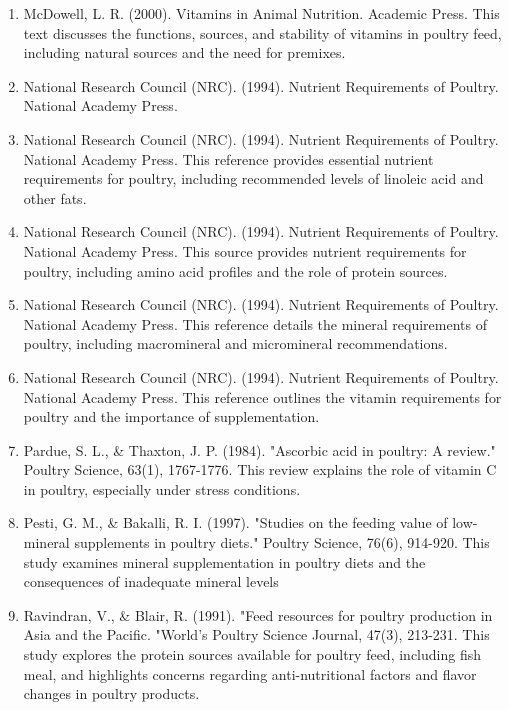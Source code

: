 \documentclass[a4paper,12pt]{article}
\begin{document}
\begin{enumerate}
	\item McDowell, L. R. (2000). Vitamins in Animal Nutrition. Academic Press. This text
discusses the functions, sources, and stability of vitamins in poultry feed, including
natural sources and the need for premixes.

	\item National Research Council (NRC). (1994). Nutrient Requirements of Poultry. National
Academy Press.

	\item National Research Council (NRC). (1994). Nutrient Requirements of Poultry. National
Academy Press. This reference provides essential nutrient requirements for poultry,
including recommended levels of linoleic acid and other fats.

	\item National Research Council (NRC). (1994). Nutrient Requirements of Poultry. National
Academy Press. This source provides nutrient requirements for poultry, including amino
acid profiles and the role of protein sources.

	\item National Research Council (NRC). (1994). Nutrient Requirements of Poultry. National
Academy Press. This reference details the mineral requirements of poultry, including
macromineral and micromineral recommendations.

	\item National Research Council (NRC). (1994). Nutrient Requirements of Poultry. National
Academy Press. This reference outlines the vitamin requirements for poultry and the
importance of supplementation.

	\item Pardue, S. L., \& Thaxton, J. P. (1984). "Ascorbic acid in poultry: A review." Poultry
Science, 63(1), 1767-1776. This review explains the role of vitamin C in poultry,
especially under stress conditions.

	\item Pesti, G. M., \& Bakalli, R. I. (1997). "Studies on the feeding value of low-mineral
supplements in poultry diets." Poultry Science, 76(6), 914-920. This study examines
mineral supplementation in poultry diets and the consequences of inadequate mineral
levels

	\item Ravindran, V., \& Blair, R. (1991). "Feed resources for poultry production in Asia and the
Pacific. "World's Poultry Science Journal, 47(3), 213-231. This study explores the protein
sources available for poultry feed, including fish meal, and highlights concerns regarding
anti-nutritional factors and flavor changes in poultry products.


\end{enumerate}
\end{document}
